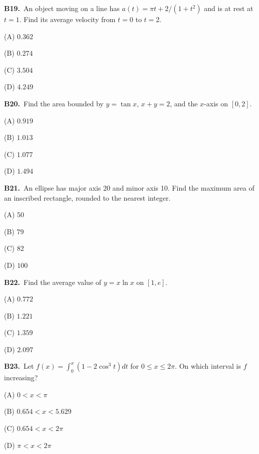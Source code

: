 \documentclass[11pt]{article}
\begin{document}
\bigskip\noindent\textbf{B19.}\ An object moving on a line has $a(t)=\pi t+2/(1+t^2)$ and is at rest at $t=1$. Find its average velocity from $t=0$ to $t=2$.
\begin{list}{}{\setlength{\leftmargin}{3em}\setlength{\labelwidth}{2.5em}\setlength{\itemsep}{0pt}\setlength{\topsep}{2pt}}
\item[(A)] $0.362$
\item[(B)] $0.274$
\item[(C)] $3.504$
\item[(D)] $4.249$
\end{list}

\bigskip\noindent\textbf{B20.}\ Find the area bounded by $y=\tan x$, $x+y=2$, and the $x$-axis on $[0,2]$.
\begin{list}{}{\setlength{\leftmargin}{3em}\setlength{\labelwidth}{2.5em}\setlength{\itemsep}{0pt}\setlength{\topsep}{2pt}}
\item[(A)] $0.919$
\item[(B)] $1.013$
\item[(C)] $1.077$
\item[(D)] $1.494$
\end{list}

\bigskip\noindent\textbf{B21.}\ An ellipse has major axis 20 and minor axis 10. Find the maximum area of an inscribed rectangle, rounded to the nearest integer.
\begin{list}{}{\setlength{\leftmargin}{3em}\setlength{\labelwidth}{2.5em}\setlength{\itemsep}{0pt}\setlength{\topsep}{2pt}}
\item[(A)] $50$
\item[(B)] $79$
\item[(C)] $82$
\item[(D)] $100$
\end{list}

\bigskip\noindent\textbf{B22.}\ Find the average value of $y=x\ln x$ on $[1,e]$.
\begin{list}{}{\setlength{\leftmargin}{3em}\setlength{\labelwidth}{2.5em}\setlength{\itemsep}{0pt}\setlength{\topsep}{2pt}}
\item[(A)] $0.772$
\item[(B)] $1.221$
\item[(C)] $1.359$
\item[(D)] $2.097$
\end{list}

\bigskip\noindent\textbf{B23.}\ Let $f(x)=\int_0^x(1-2\cos^3t)dt$ for $0\le x\le2\pi$. On which interval is $f$ increasing?
\begin{list}{}{\setlength{\leftmargin}{3em}\setlength{\labelwidth}{2.5em}\setlength{\itemsep}{0pt}\setlength{\topsep}{2pt}}
\item[(A)] $0<x<\pi$
\item[(B)] $0.654<x<5.629$
\item[(C)] $0.654<x<2\pi$
\item[(D)] $\pi<x<2\pi$
\end{list}
\end{document}
